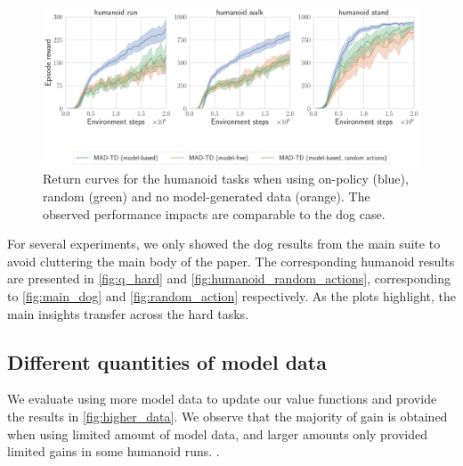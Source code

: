 \begin{figure}[H]
    \centering
    \includegraphics[width=0.9\linewidth]{figures/mad-td/humanoid_random_actions.pdf}
    \caption{Return curves for the humanoid tasks when using on-policy (blue), random (green) and no model-generated data (orange). The observed performance impacts are comparable to the dog case.}
    \label{fig:humanoid_random_actions}
\end{figure}

For several experiments, we only showed the dog results from the main suite to avoid cluttering the main body of the paper.
The corresponding humanoid results are presented in \autoref{fig:q_hard} and \autoref{fig:humanoid_random_actions}, corresponding to \autoref{fig:main_dog} and \autoref{fig:random_action} respectively.
As the plots highlight, the main insights transfer across the hard tasks.

\newpage

\subsection{Different quantities of model data}
\label{app:model_data}

We evaluate using more model data to update our value functions and provide the results in \autoref{fig:higher_data}.
We observe that the majority of gain is obtained when using limited amount of model data, and larger amounts only provided limited gains in some humanoid runs.
.

